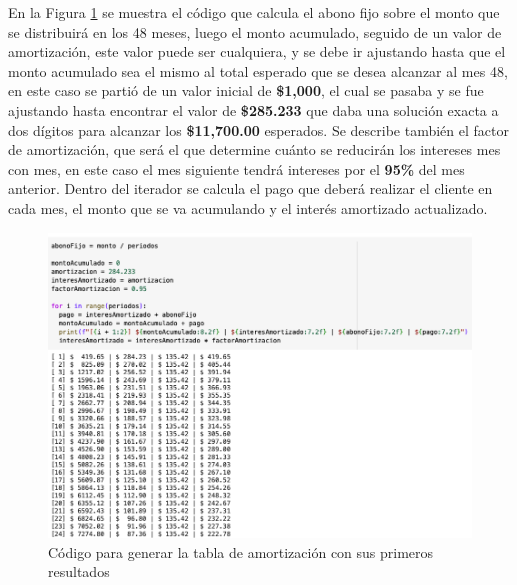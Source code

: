 \documentclass{article}
\begin{document}
\break
\noindent
En la Figura \ref{fig:s108-2} se muestra el código que calcula el abono fijo sobre el monto que se distribuirá en los 48 meses, luego el monto acumulado, seguido de un valor de amortización, este valor puede ser cualquiera, y se debe ir ajustando hasta que el monto acumulado sea el mismo al total esperado que se desea alcanzar al mes 48, en este caso se partió de un valor inicial de \textbf{\$1,000}, el cual se pasaba y se fue ajustando hasta encontrar el valor de \textbf{\$285.233} que daba una solución exacta a dos dígitos para alcanzar los \textbf{\$11,700.00} esperados. Se describe también el factor de amortización, que será el que determine cuánto se reducirán los intereses mes con mes, en este caso el mes siguiente tendrá intereses por el \textbf{95\%} del mes anterior. Dentro del iterador se calcula el pago que deberá realizar el cliente en cada mes, el monto que se va acumulando y el interés amortizado actualizado.
\begin{figure}[!ht]
    \centering
    \begin{minipage}{\textwidth}
        \centering
        \includegraphics[width=\textwidth]{figures/s108-2.png}
    \end{minipage}
    \captionsetup{width=0.9\textwidth}
    \caption{Código para generar la tabla de amortización con sus primeros resultados}
    \label{fig:s108-2}
\end{figure}
\end{document}
